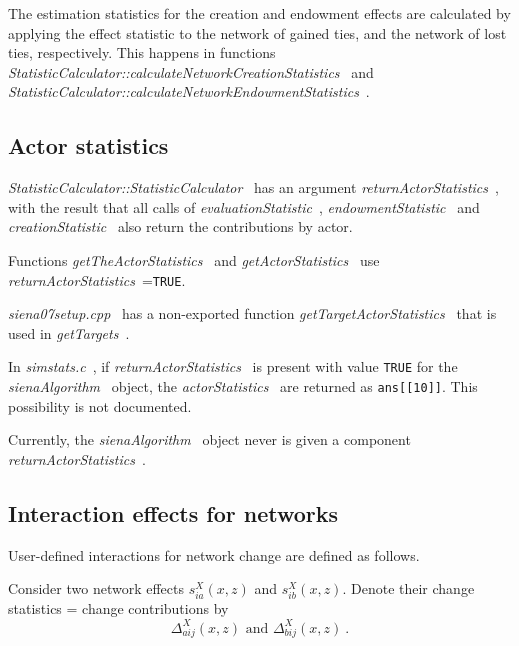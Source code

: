 \documentclass[a4paper,12pt,fleqn]{article}
\newcommand{\nnm}[1]{\textsf{\small\textit{#1}\ }}
\begin{document}
The estimation statistics for the creation and endowment effects
are calculated by applying the effect statistic to the network
of gained ties, and the network of lost ties, respectively.
This happens in functions \\
\nnm{StatisticCalculator::calculateNetworkCreationStatistics} and \\
\nnm{StatisticCalculator::calculateNetworkEndowmentStatistics}.


\subsection{Actor statistics}

\nnm{StatisticCalculator::StatisticCalculator} has an argument
\nnm{returnActorStatistics}, with the result that all calls of \nnm{evaluationStatistic},
\nnm{endowmentStatistic} and \nnm{creationStatistic} also return the contributions by actor.

Functions \nnm{getTheActorStatistics} and \nnm{getActorStatistics} use\\
\nnm{returnActorStatistics}=\texttt{TRUE}.

\nnm{siena07setup.cpp} has a non-exported function
\nnm{getTargetActorStatistics} that is used in \nnm{getTargets}.

In \nnm{simstats.c}, if \nnm{returnActorStatistics}
is present with value \texttt{TRUE} for the \nnm{sienaAlgorithm} object,
the \nnm{actorStatistics} are returned as \texttt{ans[[10]]}.
This possibility is not documented.

Currently, the \nnm{sienaAlgorithm} object never is given a component\\
\nnm{returnActorStatistics}.


\subsection{Interaction effects for networks}

User-defined interactions for network change are defined as follows.

Consider two network effects $ s_{ia}^X(x,z)$ and $ s_{ib}^X(x,z)$.
Denote their change statistics = change contributions by
\[
\Delta_{aij}^X(x,z) \text{  and  }  \Delta_{bij}^X(x,z) \ .
\]

\end{document}
